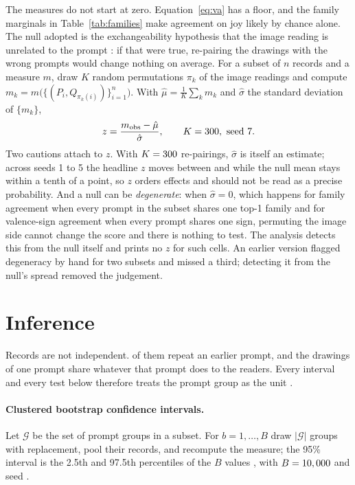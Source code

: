 The measures do not start at zero. Equation~\ref{eq:va} has a floor, and the family marginals in Table~\ref{tab:families} make agreement on joy likely by chance alone. The null adopted is the exchangeability hypothesis that the image reading is unrelated to the prompt \cite{good2005permutation}: if that were true, re-pairing the drawings with the wrong prompts would change nothing on average. For a subset of $n$ records and a measure $m$, draw $K$ random permutations $\pi_k$ of the image readings and compute $m_k = m\bigl(\{(P_i, Q_{\pi_k(i)})\}_{i=1}^{n}\bigr)$. With $\hat\mu = \frac{1}{K}\sum_k m_k$ and $\hat\sigma$ the standard deviation of $\{m_k\}$,
\begin{equation}
z = \frac{m_{\mathrm{obs}} - \hat\mu}{\hat\sigma}, \qquad K = 300,\ \text{seed}\ 7 .
\label{eq:z}
\end{equation}
Two cautions attach to $z$. With $K = 300{}$ re-pairings, $\hat\sigma$ is itself an estimate; across seeds 1 to 5 the headline $z$ moves between \ZSeedMin{} and \ZSeedMax{} while the null mean stays within a tenth of a point, so $z$ orders effects and should not be read as a precise probability. And a null can be \emph{degenerate}: when $\hat\sigma = 0$, which happens for family agreement when every prompt in the subset shares one top-1 family and for valence-sign agreement when every prompt shares one sign, permuting the image side cannot change the score and there is nothing to test. The analysis detects this from the null itself and prints no $z$ for such cells. An earlier version flagged degeneracy by hand for two subsets and missed a third; detecting it from the null's spread removed the judgement.

\section{Inference}
\label{sec:method-inference}

Records are not independent. \nRepeats{} of them repeat an earlier prompt, and the drawings of one prompt share whatever that prompt does to the readers. Every interval and every test below therefore treats the prompt group as the unit \cite{cameron2008bootstrap}.

\paragraph{Clustered bootstrap confidence intervals.} Let $\mathcal{G}$ be the set of prompt groups in a subset. For $b = 1, \dots, B$ draw $|\mathcal{G}|$ groups with replacement, pool their records, and recompute the measure; the 95\% interval is the 2.5th and 97.5th percentiles of the $B$ values \cite{efron1993introduction}, with $B = 10,000$ and seed \nullSeed.

